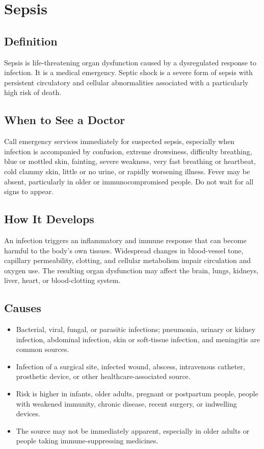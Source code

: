 \chapter{Sepsis}

\section*{Definition}
Sepsis is life-threatening organ dysfunction caused by a dysregulated response to infection. It is a medical emergency. Septic shock is a severe form of sepsis with persistent circulatory and cellular abnormalities associated with a particularly high risk of death.

\section*{When to See a Doctor}
Call emergency services immediately for suspected sepsis, especially when infection is accompanied by confusion, extreme drowsiness, difficulty breathing, blue or mottled skin, fainting, severe weakness, very fast breathing or heartbeat, cold clammy skin, little or no urine, or rapidly worsening illness. Fever may be absent, particularly in older or immunocompromised people. Do not wait for all signs to appear.

\section*{How It Develops}
An infection triggers an inflammatory and immune response that can become harmful to the body's own tissues. Widespread changes in blood-vessel tone, capillary permeability, clotting, and cellular metabolism impair circulation and oxygen use. The resulting organ dysfunction may affect the brain, lungs, kidneys, liver, heart, or blood-clotting system.

\section*{Causes}
\begin{itemize}
  \item Bacterial, viral, fungal, or parasitic infections; pneumonia, urinary or kidney infection, abdominal infection, skin or soft-tissue infection, and meningitis are common sources.
  \item Infection of a surgical site, infected wound, abscess, intravenous catheter, prosthetic device, or other healthcare-associated source.
  \item Risk is higher in infants, older adults, pregnant or postpartum people, people with weakened immunity, chronic disease, recent surgery, or indwelling devices.
  \item The source may not be immediately apparent, especially in older adults or people taking immune-suppressing medicines.
\end{itemize}

